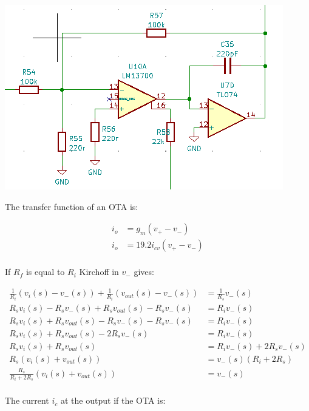 \documentclass{article}
\begin{document}
\includegraphics[width=\linewidth]{images/incorrect-otacell.png}

The transfer function of an OTA is:

\begin{equation*}
\begin{split}
  i_o & = g_m(v_+ - v_-) \\
  i_o & = 19.2i_{cv}(v_+ - v_-) \\
\end{split}
\end{equation*}

If $R_f$ is equal to $R_i$
Kirchoff in $v_-$ gives:

\begin{equation*}
\begin{split}
  \frac{1}{R_i}(v_i(s) - v_-(s)) + \frac{1}{R_i}(v_{out}(s) - v_-(s)) & = \frac{1}{R_s}v_-(s) \\
  {R_s}v_i(s) - {R_s}v_-(s) + {R_s}v_{out}(s) - {R_s}v_-(s) & = {R_i}v_-(s) \\
  {R_s}v_i(s) + {R_s}v_{out}(s) - {R_s}v_-(s) - {R_s}v_-(s) & = {R_i}v_-(s) \\
  {R_s}v_i(s) + {R_s}v_{out}(s) - 2{R_s}v_-(s) & = {R_i}v_-(s) \\
  {R_s}v_i(s) + {R_s}v_{out}(s) & = {R_i}v_-(s) + 2{R_s}v_-(s) \\
  {R_s}(v_i(s) + v_{out}(s)) & = v_-(s)({R_i} + 2{R_s}) \\
  \frac{R_s}{{R_i} + 2{R_s}}(v_i(s) + v_{out}(s)) & = v_-(s) \\
\end{split}
\end{equation*}

The current $i_c$ at the output if the OTA is:
\end{document}
